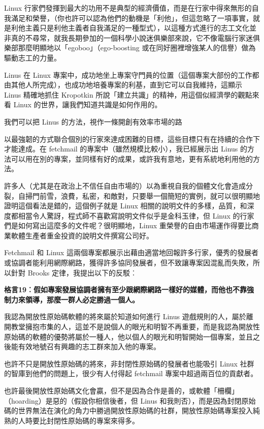 \documentclass[10pt, b5paper]{book}
\makeatletter
\newcommand*{\shifttext}[2]{%
  \settowidth{\@tempdima}{#2}%
  \makebox[\@tempdima]{\hspace*{#1}#2}%
}
\makeatother
\begin{document}
Linux
行家們發揮到最大的功用不是典型的經濟價值，而是在行家中得來無形的自我滿足和榮譽，（你也許可以認為他們的動機是「利他」，但這忽略了一項事實，就是利他主義只是利他主義者自我滿足的一種型式），以這種方式進行的志工文化並非真的不尋常，就我長期參加的一個科學小說迷俱樂部來說，它不像電腦行家迷俱樂部那麼明顯地以「egoboo」（ego-boosting
或在同好圈裡增強某人的信譽）做為驅動志工的力量。

Linus 在 Linux
專案中，成功地坐上專案守門員的位置（這個專案大部份的工作都由其他人所完成），也成功地培養專案的利基，直到它可以自我維持，這顯示
Linus 精確地抓住 Kropotkin
所說「建立共識」的精神，用這個似經濟學的觀點來看 Linux
的世界，讓我們知道共識是如何作用的。

我們可以把 Linus 的方法，視作一條開創有效率市場的路 \shifttext{1pt}{---}\shifttext{-1pt}{---}
以最強韌的方式聯合個別的行家來達成困難的目標，這些目標只有在持續的合作下才能達成。在
fetchmail 的專案中（雖然規模比較小），我已經展示出 Linus
的方法可以用在別的專案，並同樣有好的成果，或許我有意地，更有系統地利用他的方法。

許多人（尤其是在政治上不信任自由市場的）以為重視自我的個體文化會造成分裂，自掃門前雪，浪費，私密，和敵對，只要舉一個簡短的實例，就可以很明顯地證明這個看法是錯的，這個例子就是
Linux
相關的說明文件的多樣，品質，和深度都相當令人驚訝，程式師不喜歡寫說明文件似乎是金科玉律，但
Linux 的行家們是如何寫出這麼多的文件呢？很明顯地，Linux
重榮譽的自由市場運作得要比商業軟體生產者重金投資的說明文件撰寫公司好。

Fetchmail 和 Linux
這兩個專案都展示出藉由適當地回報許多行家，優秀的發展者或協調者能利用網際網路，獲得許多協同發展者，但不致讓專案因混亂而失敗，所以針對
Brooks 定律，我提出以下的反駁︰

\textbf{格言19︰假如專案發展協調者擁有至少跟網際網路一樣好的媒體，而他也不靠強制力來領導，那麼一群人必定勝過一個人。}

我認為開放性原始碼軟體的將來屬於知道如何進行 Linus
遊戲規則的人，屬於離開教堂擁抱市集的人，這並不是說個人的眼光和明智不再重要，而是我認為開放性原始碼的軟體的優勢將屬於一種人，他以個人的眼光和明智開始一個專案，並且之後能有效地號召有興趣的志工群來加入他的專案。

也許不只是開放性原始碼的將來，非封閉性原始碼的發展者也能吸引 Linux
社群的智庫到他們的問題上，很少有人付得起 fetchmail
專案中超過兩百位的貢獻者。

也許最後開放性原始碼文化會贏，但不是因為合作是善的，或軟體「柵欄」（hoarding）是惡的（假設你相信後者，但
Linus
和我則否），而是因為封閉原始碼的世界無法在演化的角力中勝過開放性原始碼的社群，開放性原始碼專案投入純熟的人時要比封閉性原始碼的專案來得多。
\end{document}
